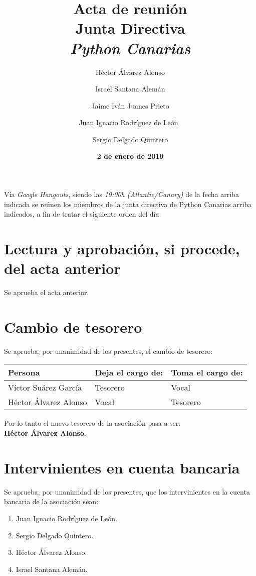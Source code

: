 \documentclass[a4paper, 12pt]{article}
\title{\huge \textbf{Acta de reunión} \\ Junta Directiva \\ \textit{Python Canarias}}
\date{\textbf{2 de enero de 2019}}
\author{
    Héctor Álvarez Alonso \and
    Israel Santana Alemán \and
    Jaime Iván Juanes Prieto \and
    Juan Ignacio Rodríguez de León\ \and 
    Sergio Delgado Quintero
}
\begin{document}
\renewcommand{\contentsname}{Orden del día}

\maketitle

Vía \textit{Google Hangouts}, siendo las \textit{19:00h (Atlantic/Canary)} de la fecha arriba indicada se reúnen los miembros de la junta directiva de Python Canarias arriba indicados, a fin de tratar el siguiente orden del día:

\tableofcontents

\section{Lectura y aprobación, si procede, del acta anterior}

Se aprueba el acta anterior.

\section{Cambio de tesorero}

Se aprueba, por unanimidad de los presentes, el cambio de tesorero:\\

\begin{tabular}{|l|l|l|}
    \hline
    \bf Persona & \bf Deja el cargo de: & \bf Toma el cargo de:\\
    \hline
    Víctor Suárez García & Tesorero & Vocal\\
    \hline
    Héctor Álvarez Alonso & Vocal & Tesorero\\
    \hline
\end{tabular}

\vspace{3mm}

Por lo tanto el nuevo tesorero de la asociación pasa a ser:\\
\indent \textbf{Héctor Álvarez Alonso}.

\section{Intervinientes en cuenta bancaria}

Se aprueba, por unanimidad de los presentes, que los intervinientes en la cuenta bancaria de la asociación sean:

\begin{enumerate}
    \item Juan Ignacio Rodríguez de León.
    \item Sergio Delgado Quintero.
    \item Héctor Álvarez Alonso.
    \item Israel Santana Alemán.
\end{enumerate}
\end{document}
